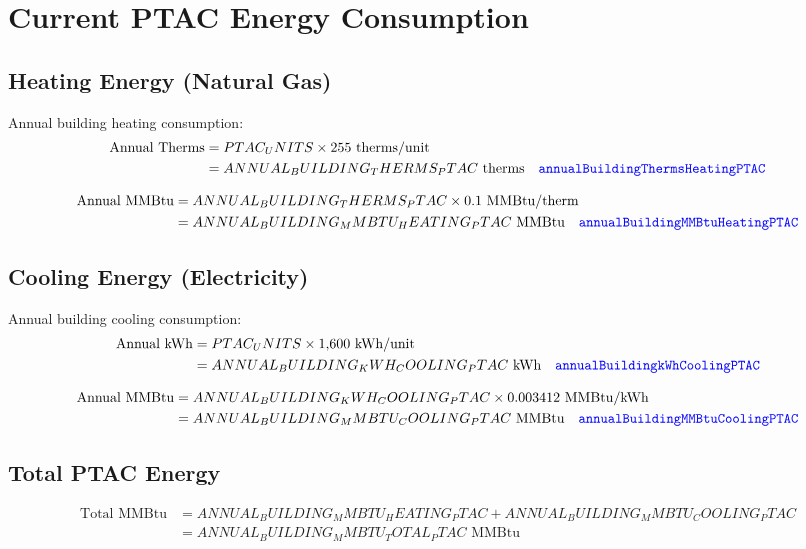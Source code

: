 \documentclass[11pt,letterpaper]{article}
\newcommand{\code}[1]{\textcolor{blue}{\texttt{#1}}}
\begin{document}
\section{Current PTAC Energy Consumption}

\subsection{Heating Energy (Natural Gas)}
Annual building heating consumption:
\begin{align}
\text{Annual Therms} &= {{PTAC_UNITS}} \times 255 \text{ therms/unit} \\
&= {{ANNUAL_BUILDING_THERMS_PTAC}} \text{ therms} \quad \code{annualBuildingThermsHeatingPTAC}
\end{align}

\begin{align}
\text{Annual MMBtu} &= {{ANNUAL_BUILDING_THERMS_PTAC}} \times 0.1 \text{ MMBtu/therm} \\
&= {{ANNUAL_BUILDING_MMBTU_HEATING_PTAC}} \text{ MMBtu} \quad \code{annualBuildingMMBtuHeatingPTAC}
\end{align}

\subsection{Cooling Energy (Electricity)}
Annual building cooling consumption:
\begin{align}
\text{Annual kWh} &= {{PTAC_UNITS}} \times 1{,}600 \text{ kWh/unit} \\
&= {{ANNUAL_BUILDING_KWH_COOLING_PTAC}} \text{ kWh} \quad \code{annualBuildingkWhCoolingPTAC}
\end{align}

\begin{align}
\text{Annual MMBtu} &= {{ANNUAL_BUILDING_KWH_COOLING_PTAC}} \times 0.003412 \text{ MMBtu/kWh} \\
&= {{ANNUAL_BUILDING_MMBTU_COOLING_PTAC}} \text{ MMBtu} \quad \code{annualBuildingMMBtuCoolingPTAC}
\end{align}

\subsection{Total PTAC Energy}
\begin{align}
\text{Total MMBtu} &= {{ANNUAL_BUILDING_MMBTU_HEATING_PTAC}} + {{ANNUAL_BUILDING_MMBTU_COOLING_PTAC}} \\
&= {{ANNUAL_BUILDING_MMBTU_TOTAL_PTAC}} \text{ MMBtu}
\end{align}
\end{document}
